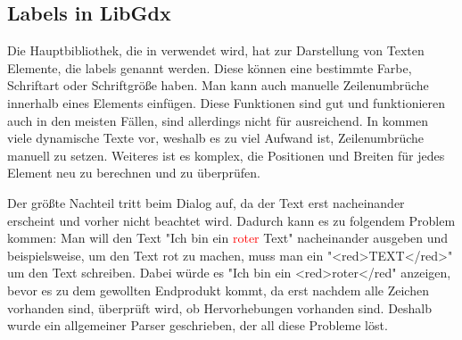 
\renewcommand{\kapitelautor}{Autor: Felix Zwickelstorfer}
\subsection{Labels in LibGdx}\label{subsec:labels-in-gdx}
\renewcommand{\kapitelautor}{Autor: Felix Zwickelstorfer}

Die Hauptbibliothek, die in \FF verwendet wird, hat zur Darstellung von Texten Elemente, die labels genannt werden.
Diese können eine bestimmte Farbe, Schriftart oder Schriftgröße haben.
Man kann auch manuelle Zeilenumbrüche innerhalb eines Elements einfügen.
Diese Funktionen sind gut und funktionieren auch in den meisten Fällen, sind allerdings nicht für \FF ausreichend.
In \FF kommen viele dynamische Texte vor, weshalb es zu viel Aufwand ist, Zeilenumbrüche manuell zu setzen.
Weiteres ist es komplex, die Positionen und Breiten für jedes Element neu zu berechnen und zu überprüfen.

Der größte Nachteil tritt beim Dialog auf, da der Text erst nacheinander erscheint und vorher nicht beachtet wird.
Dadurch kann es zu folgendem Problem kommen:
Man will den Text "Ich bin ein \textcolor{red}{roter} Text" nacheinander ausgeben und beispielsweise, um den Text rot zu machen, muss man ein "<red>TEXT</red>" um den Text schreiben.
Dabei würde es "Ich bin ein <red>roter</red" anzeigen, bevor es zu dem gewollten Endprodukt kommt, da erst nachdem alle Zeichen vorhanden sind, überprüft wird, ob Hervorhebungen vorhanden sind.
Deshalb wurde ein allgemeiner Parser geschrieben, der all diese Probleme löst.